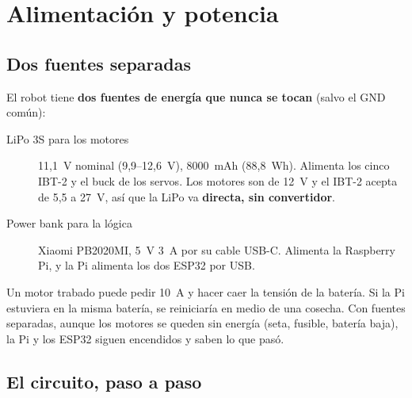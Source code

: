 \chapter{Alimentación y potencia}\label{cap:potencia}

\section{Dos fuentes separadas}

El robot tiene \textbf{dos fuentes de energía que nunca se tocan} (salvo el GND común):

\begin{description}
  \item[LiPo 3S para los motores] 11,1~V nominal (9,9--12,6~V), 8000~mAh (88,8~Wh). Alimenta los cinco IBT-2 y el
        buck de los servos. Los motores son de 12~V y el IBT-2 acepta de 5,5 a 27~V, así que la LiPo va
        \textbf{directa, sin convertidor}.
  \item[Power bank para la lógica] Xiaomi PB2020MI, 5~V 3~A por su cable USB-C. Alimenta la Raspberry Pi, y la Pi
        alimenta los dos ESP32 por USB.
\end{description}

\begin{idea}
Un motor trabado puede pedir 10~A y hacer caer la tensión de la batería. Si la Pi estuviera en la misma batería,
se reiniciaría en medio de una cosecha. Con fuentes separadas, aunque los motores se queden sin energía (seta,
fusible, batería baja), la Pi y los ESP32 siguen encendidos y saben lo que pasó.
\end{idea}

\section{El circuito, paso a paso}

